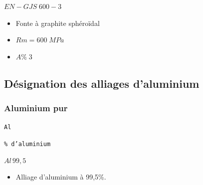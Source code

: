 \documentclass[11pt,oneside]{article}
\begin{document}
\begin{exemple}
\begin{minipage}[c]{.3\linewidth}
\begin{center}
$ EN-GJS\;600-3$
\end{center}
\end{minipage} \hfill
\begin{minipage}[c]{.6\linewidth}
\begin{itemize}
\item Fonte à graphite sphéroïdal
\item $Rm = 600\; MPa$
\item $A\%\; 3$
\end{itemize}
\end{minipage}

\end{exemple}




\subsection{Désignation des alliages d'aluminium}

\subsubsection{Aluminium pur}

\begin{resultat}

\begin{minipage}[c]{.3\linewidth}
\begin{center}
\texttt{Al}
\end{center}
\end{minipage} \hfill
\begin{minipage}[c]{.3\linewidth}
\begin{center}
\texttt{\% d'aluminium}
\end{center}
\end{minipage} 
\end{resultat}


\begin{exemple}
\begin{minipage}[c]{.3\linewidth}
\begin{center}
$ Al \, 99,5$
\end{center}
\end{minipage} \hfill
\begin{minipage}[c]{.6\linewidth}
\begin{itemize}
\item Alliage d'aluminium à 99,5\%.
\end{itemize}
\end{minipage}

\end{exemple}
\end{document}

